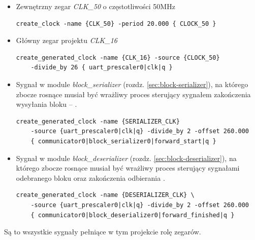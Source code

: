 \begin{itemize}
\item Zewnętrzny zegar \textit{CLK\_50} o częstotliwości 50MHz
\begin{lstlisting}[basicstyle=\footnotesize]
create_clock -name {CLK_50} -period 20.000 { CLOCK_50 }
\end{lstlisting}

\item Główny zegar projektu \textit{CLK\_16}
\begin{lstlisting}[basicstyle=\footnotesize]
create_generated_clock -name {CLK_16} -source {CLOCK_50} 
	-divide_by 26 { uart_prescaler0|clk|q }
\end{lstlisting}

\item Sygnał w module \textit{block\_serializer} (rozdz. \ref{sec:block-serializer}), na którego zbocze rosnące musiał być wrażliwy proces sterujący sygnałem zakończenia wysyłania bloku -- .
\begin{lstlisting}[basicstyle=\footnotesize]
create_generated_clock -name {SERIALIZER_CLK} 
	-source {uart_prescaler0|clk|q} -divide_by 2 -offset 260.000 
	{ communicator0|block_serializer0|forward_start|q }
\end{lstlisting}

\item Sygnał w module \textit{block\_deserializer} (rozdz. \ref{sec:block-deserializer}), na którego zbocze rosnące musiał być wrażliwy proces sterujący sygnałami odebranego bloku  oraz zakończenia odbierania .
\begin{lstlisting}[basicstyle=\footnotesize]
create_generated_clock -name {DESERIALIZER_CLK} \
	-source {uart_prescaler0|clk|q} -divide_by 2 -offset 260.000 
	{ communicator0|block_deserializer0|forward_finished|q }
\end{lstlisting}

\end{itemize}

Są to wszystkie sygnały pełniące w tym projekcie rolę zegarów.










\newpage